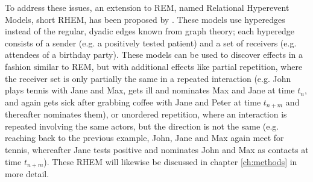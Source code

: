 To address these issues, an extension to REM, named Relational Hyperevent Models, short RHEM, has been proposed by . These models use hyperedges instead of the regular, dyadic edges known from graph theory; each hyperedge consists of a sender (e.g. a positively tested patient) and a set of receivers (e.g. attendees of a birthday party). These models can be used to discover effects in a fashion similar to REM, but with additional effects like partial repetition, where the receiver set is only partially the same in a repeated interaction (e.g. John plays tennis with Jane and Max, gets ill and nominates Max and Jane at time $t_n$, and again gets sick after grabbing coffee with Jane and Peter at time $t_{n+m}$ and thereafter nominates them), or unordered repetition, where an interaction is repeated involving the same actors, but the direction is not the same (e.g. reaching back to the previous example, John, Jane and Max again meet for tennis, whereafter Jane tests positive and nominates John and Max as contacts at time $t_{n+m}$). These RHEM will likewise be discussed in chapter \ref{ch:methods} in more detail.